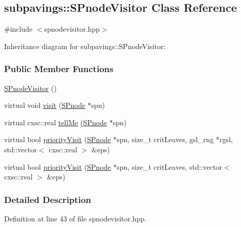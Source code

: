 \hypertarget{classsubpavings_1_1SPnodeVisitor}{\subsection{subpavings\-:\-:\-S\-Pnode\-Visitor \-Class \-Reference}
\label{classsubpavings_1_1SPnodeVisitor}
}


{\ttfamily \#include $<$spnodevisitor.\-hpp$>$}



\-Inheritance diagram for subpavings\-:\-:\-S\-Pnode\-Visitor\-:
\subsubsection*{\-Public \-Member \-Functions}
\begin{DoxyCompactItemize}
\item 
\hyperlink{classsubpavings_1_1SPnodeVisitor_a84110f6eacb81e0f2167e869261fe16e}{\-S\-Pnode\-Visitor} ()
\item 
virtual void \hyperlink{classsubpavings_1_1SPnodeVisitor_ab66d7c252cd58fc14214315033521a80}{visit} (\hyperlink{classsubpavings_1_1SPnode}{\-S\-Pnode} $\ast$spn)
\item 
virtual cxsc\-::real \hyperlink{classsubpavings_1_1SPnodeVisitor_a8c10bef76c4e6ed1ca3e718032fdd2b3}{tell\-Me} (\hyperlink{classsubpavings_1_1SPnode}{\-S\-Pnode} $\ast$spn)
\item 
virtual bool \hyperlink{classsubpavings_1_1SPnodeVisitor_a633b9f0d58f12fff44a15389bda500c4}{priority\-Visit} (\hyperlink{classsubpavings_1_1SPnode}{\-S\-Pnode} $\ast$spn, size\-\_\-t crit\-Leaves, gsl\-\_\-rng $\ast$rgsl, std\-::vector$<$ cxsc\-::real $>$ \&eps)
\item 
virtual bool \hyperlink{classsubpavings_1_1SPnodeVisitor_ad6252053bfda7d8a06ff7f434338d3a1}{priority\-Visit} (\hyperlink{classsubpavings_1_1SPnode}{\-S\-Pnode} $\ast$spn, size\-\_\-t crit\-Leaves, std\-::vector$<$ cxsc\-::real $>$ \&eps)
\end{DoxyCompactItemize}


\subsubsection{\-Detailed \-Description}


\-Definition at line 43 of file spnodevisitor.\-hpp.



